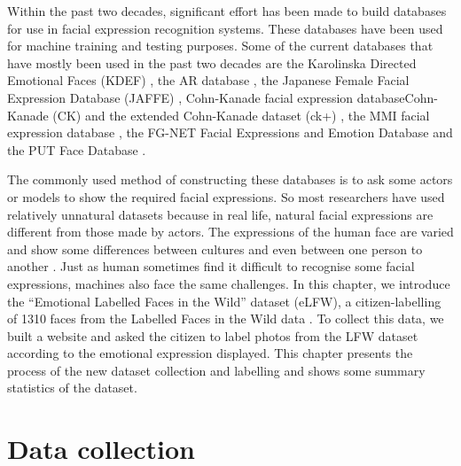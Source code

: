  Within the past two decades, significant effort has been made to build databases for use in facial expression recognition systems. These databases have been used for machine training and testing purposes. Some of the current databases that have mostly been used in the past two decades are the Karolinska Directed Emotional Faces (KDEF) \cite{lundqvist1998karolinska}, the AR database \citep{martinez1998ar}, the Japanese Female Facial Expression Database (JAFFE) \citep{lyons1998coding}, Cohn-Kanade facial expression databaseCohn-Kanade (CK) \citep{kanade2000comprehensive} and the extended Cohn-Kanade dataset (ck+) \citep{lucey2010extended}, the MMI facial expression database \citep{pantic2005web}, the FG-NET Facial Expressions and Emotion Database \citep{ekman1971universals, wallhoff2006facial} and the PUT Face Database \citep{kasinski2008put}.
 
  

The commonly used method of constructing these databases is to ask some actors or models to show the required facial expressions. So most researchers have used relatively unnatural datasets because in real life, natural facial expressions are different from those made by actors. The expressions of the human face are varied and show some differences between cultures and even between one person to another \citep{ekman1973cross}. Just as human sometimes find it difficult to recognise some facial expressions, machines also face the same challenges.
In this chapter, we introduce the ``Emotional Labelled Faces in the Wild'' dataset (eLFW), a citizen-labelling of 1310 faces from the Labelled Faces in the Wild data \citep{huang2007labeled}. To collect this data, we built a website and asked the citizen to label photos from the LFW dataset according to the emotional expression displayed. This chapter presents the process of the new dataset collection and labelling and shows some summary statistics of the dataset.


\section{Data collection}

 

